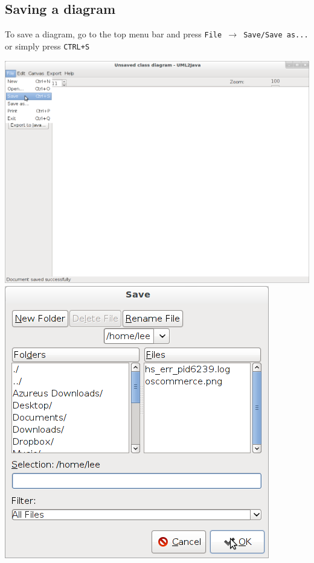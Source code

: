 \documentclass[a4paper]{article}
\begin{document}
\subsection{Saving a diagram} 
To save a diagram, go to the top menu bar and press \texttt{File $\rightarrow$ Save/Save as...} or simply press \texttt{CTRL+S}
\begin{center} \includegraphics[trim = 0pt 300pt 700pt 0pt, clip, scale=0.4]{./images/file-save1.png}     
\includegraphics[scale=0.4]{./images/file-save2.png} \end{center}
\newpage
\end{document}
